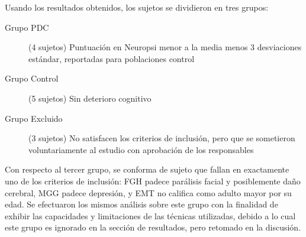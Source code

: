 Usando los resultados obtenidos, los sujetos se dividieron en tres grupos:
\begin{description}
\item[Grupo PDC] (4 sujetos) Puntuación en Neuropsi menor a la media menos 3 desviaciones 
estándar, reportadas para poblaciones control \cite{Solis03}
\item[Grupo Control] (5 sujetos) Sin deterioro cognitivo
\item[Grupo Excluido] (3 sujetos) No satisfacen los criterios de inclusión, pero que se 
sometieron voluntariamente al estudio con aprobación de los responsables
\end{description}

Con respecto al tercer grupo, se conforma de sujeto que fallan en exactamente uno de los criterios 
de inclusión: FGH padece parálisis facial y posiblemente daño cerebral, MGG padece depresión, y EMT 
no califica como adulto mayor por su edad.
Se efectuaron los mismos análisis sobre este grupo con la finalidad de exhibir las capacidades y
limitaciones de las técnicas utilizadas, debido a lo cual este grupo es ignorado en la sección de 
resultados, pero retomado en la discusión.

